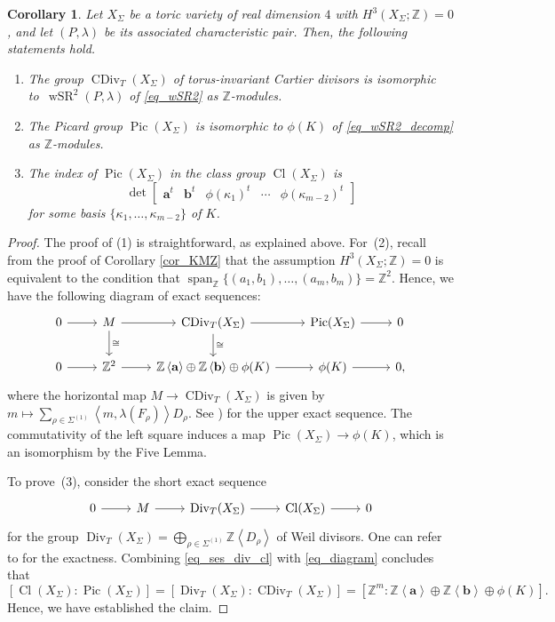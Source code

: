 \documentclass[10pt]{amsart}
\theoremstyle{plain}
\newtheorem{corollary}[theorem]{Corollary}
\theoremstyle{definition}
\numberwithin{equation}{section}
\newcommand{\ZZ}{\mathbb{Z}}
\DeclareMathOperator{\Pic}{Pic}
\DeclareMathOperator{\wSR}{wSR}
\DeclareMathOperator{\spa}{span}
\DeclareMathOperator{\CDiv}{CDiv}
\DeclareMathOperator{\Div}{Div}
\DeclareMathOperator{\clas}{Cl}
\begin{document}
\begin{corollary}\label{cor}
Let $X_{\Sigma}$ be a toric variety of real dimension $4$ with $H^3(X_{\Sigma};\ZZ)=0$, and let $(P,\lambda)$ be its associated characteristic pair. Then, the following statements hold.
\begin{enumerate}
\item The group $\CDiv_T(X_\Sigma)$ of torus-invariant Cartier divisors is isomorphic to~$\wSR^2(P, \lambda)$ of \eqref{eq_wSR2} as $\ZZ$-modules.
\item The Picard group $\Pic(X_\Sigma)$ is isomorphic to $\phi(K)$ of \eqref{eq_wSR2_decomp} as $\ZZ$-modules. 
\item The index of $\Pic(X_\Sigma)$ in the class group $\clas(X_\Sigma)$ is
\[
\det\begin{bmatrix}
\textbf{a}^t	&\textbf{b}^t	&\phi(\kappa_1)^t	&\cdots	&\phi(\kappa_{m-2})^t
\end{bmatrix}
\]
for some basis  $\{\kappa_1,\ldots,\kappa_{m-2}\}$ of $K$.
\end{enumerate}
\end{corollary}
\begin{proof}
The proof of (1) is straightforward, as explained above. For~(2), recall from the proof of Corollary \ref{cor_KMZ} that the assumption $H^3(X_\Sigma;\ZZ)=0$ is equivalent to the condition that $\spa_{\ZZ} \{ (a_1, b_1), \dots, (a_m, b_m)\}=\ZZ^2$. Hence, we have the following diagram of exact sequences: 
\begin{equation}\label{eq_diagram}
\begin{tikzcd}
0\rar & M\arrow{d}{\cong}  \rar & \CDiv_T(X_\Sigma) \rar \arrow{d}{\cong}&  \Pic(X_\Sigma) \rar & 0\\
0 \rar & \ZZ^2 \rar & \mathbb{Z}\left<\mathbf{a}\right> \oplus \mathbb{Z}\left<\mathbf{b}\right>\oplus \phi(K) \rar &  \phi(K) \rar & 0,
\end{tikzcd}
\end{equation}
where the horizontal map $M \to \CDiv_T(X_\Sigma)$ is given by $m\mapsto \sum_{\rho\in \Sigma^{(1)}} \left< m, \lambda(F_\rho) \right>D_\rho$.  See \cite[Theorem 4.2.1]{CLS}) for the upper exact sequence. 
The commutativity of the left square induces a map  $\Pic(X_{\Sigma})\to\phi(K)$, which is an isomorphism by the Five Lemma. 

To prove~(3), consider the short exact sequence 
\begin{equation}\label{eq_ses_div_cl}
\begin{tikzcd}
    0\rar & M \rar&  \Div_{T}(X_\Sigma) \rar & \clas(X_\Sigma) \rar & 0
\end{tikzcd}
\end{equation}
for the group $\Div_{T}(X_\Sigma)=\bigoplus_{\rho\in \Sigma^{(1)}}\ZZ\left<D_\rho \right>$ of Weil divisors. 
One can refer to \cite[Theorem 4.1.3]{CLS} for the exactness. Combining \eqref{eq_ses_div_cl} with \eqref{eq_diagram} concludes that 
\[
[\clas(X_\Sigma): \Pic(X_\Sigma)] = [\Div_T(X_\Sigma): \CDiv_T(X_\Sigma)] =  [\ZZ^m: \mathbb{Z}\left<\mathbf{a}\right> \oplus \mathbb{Z}\left<\mathbf{b}\right>\oplus \phi(K)].
\]
Hence, we have established the claim. 
\end{proof}
\end{document}

